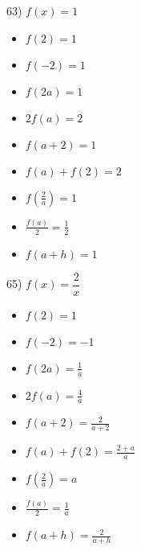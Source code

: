 \documentclass[11pt]{book}
\theoremstyle{definition}  %
\begin{document}
63) $f(x)=1$
\scriptsize
\begin{multicols}{3}
\begin{itemize}
\item  $f(2)=1$
\item  $f(-2)=1$
\item  $f(2a)=1$
\end{itemize}
\end{multicols}

\begin{multicols}{3}
\begin{itemize}
\item  $2 f(a)=2$
\item $f(a+2)=1$
\item $f(a) + f(2)=2$
\end{itemize}
\end{multicols}

\begin{multicols}{3}
\begin{itemize}
\item  $f \left( \frac{2}{a} \right)=1$
\item $\frac{f(a)}{2}=\frac{1}{2}$
\item  $f(a + h)=1$
\end{itemize}
\end{multicols}
\normalsize

65) $f(x)=\dfrac{2}{x}$
\scriptsize
\begin{multicols}{3}
\begin{itemize}
\item  $f(2)=1$
\item  $f(-2)=-1$
\item  $f(2a)=\frac{1}{a}$
\end{itemize}
\end{multicols}

\begin{multicols}{3}
\begin{itemize}
\item  $2 f(a)=\frac{4}{a}$
\item $f(a+2)=\frac{2}{a+2}$
\item $f(a) + f(2)=\frac{2+a}{a}$
\end{itemize}
\end{multicols}

\begin{multicols}{3}
\begin{itemize}
\item  $f \left( \frac{2}{a} \right)=a$
\item $\frac{f(a)}{2}=\frac{1}{a}$
\item  $f(a + h)=\frac{2}{a+h}$
\end{itemize}
\end{multicols}
\normalsize
\end{document}

